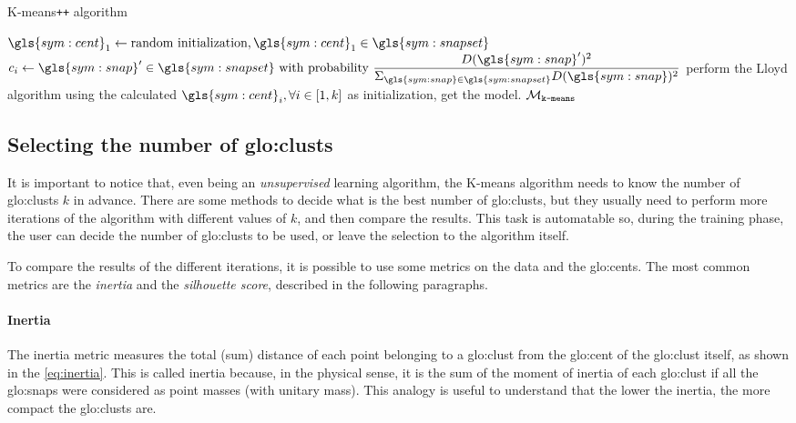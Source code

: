 \begin{algorithm}
  \caption{K-means\texttt{++} algorithm}
  \label{alg:kmeanspp}
\begin{algorithmic}[1]
  \State $\gls{sym:cent}_1 \gets \text{random initialization}, \gls{sym:cent}_1 \in \gls{sym:snapset}$
  \State $c_i \gets \gls{sym:snap}' \in \gls{sym:snapset} \text{ with probability } \dfrac{D(\gls{sym:snap}')^2}{\Sigma_{\gls{sym:snap}\in\gls{sym:snapset}}D(\gls{sym:snap})^2}$
  \EndFor
  \State perform the Lloyd algorithm using the calculated $\gls{sym:cent}_i, \forall i \in [1,k]$ as initialization, get the model.
  \State \Return $\mathcal{M}_{\text{\texttt{k-means}}}$  
  \EndFunction
\end{algorithmic}
\end{algorithm}

\subsection{Selecting the number of \gls{glo:clust}s}
It is important to notice that, even being an \emph{unsupervised} learning algorithm, the K-means algorithm needs to know the number of \gls{glo:clust}s $k$ in advance. There are some methods to decide what is the best number of \gls{glo:clust}s, but they usually need to perform more iterations of the algorithm with different values of $k$, and then compare the results. This task is automatable so, during the training phase, the user can decide the number of \gls{glo:clust}s to be used, or leave the selection to the algorithm itself.

To compare the results of the different iterations, it is possible to use some metrics on the data and the {\gls{glo:cent}}s. The most common metrics are the \emph{inertia} and the \emph{silhouette score}, described in the following paragraphs.

\paragraph*{Inertia}
The inertia metric measures the total (sum) distance of each point belonging to a \gls{glo:clust} from the {\gls{glo:cent}} of the \gls{glo:clust} itself, as shown in the \autoref{eq:inertia}. This is called inertia because, in the physical sense, it is the sum of the moment of inertia of each \gls{glo:clust} if all the {\gls{glo:snap}}s were considered as point masses (with unitary mass). This analogy is useful to understand that the lower the inertia, the more compact the \gls{glo:clust}s are.

